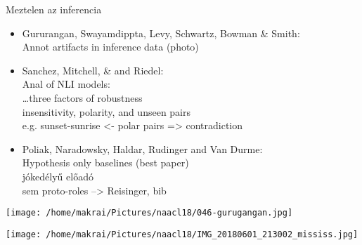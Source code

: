 \documentclass{beamer}
\begin{document}
      \begin{frame}[allowframebreaks]{Meztelen az inferencia}
        \begin{itemize} 
          \item Gururangan, Swayamdippta, Levy, Schwartz, Bowman \& Smith: \\  
            Annot artifacts in inference data (photo)
          \item Sanchez, Mitchell, \& and Riedel: \\  
            Anal of NLI models: \\  \dots   three factors of robustness
            \\ insensitivity, polarity, and unseen pairs
            \\ e.g. sunset-sunrise <- polar pairs => contradiction
          \item Poliak, Naradowsky, Haldar, Rudinger and Van Durme: \\  
            Hypothesis only baselines (best paper)
            \\ jókedélyű előadó
            \\ sem proto-roles --> Reisinger, bib 
        \end{itemize}
        \texttt{[image: /home/makrai/Pictures/naacl18/046-gurugangan.jpg]}
      \end{frame}

      \begin{frame}
        \texttt{[image: /home/makrai/Pictures/naacl18/IMG\_20180601\_213002\_mississ.jpg]}
      \end{frame}
\end{document}
